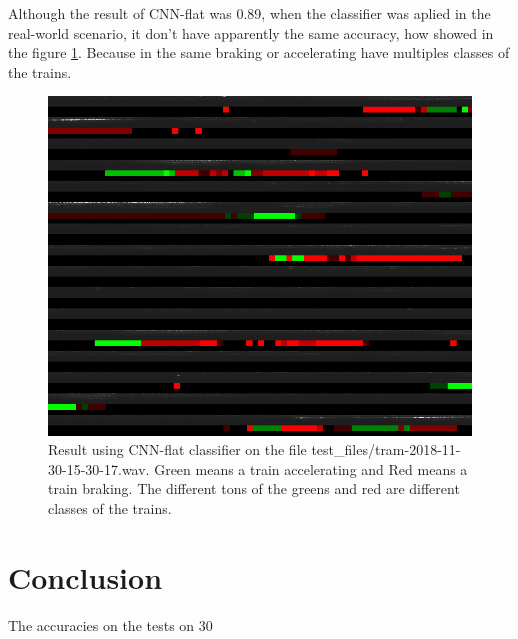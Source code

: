 \documentclass[12pt,oneside,a4paper]{article}
\begin{document}
Although the result of CNN-flat was 0.89, when the classifier was aplied in the real-world scenario, it don't have apparently the same accuracy, how showed in the figure \ref{fig:result_real}. Because in the same braking or accelerating have multiples classes of the trains.

\begin{figure}[H]
	\centering
	\includegraphics[scale=0.6]{result1.png}
	\caption{ Result using CNN-flat classifier on the file test\_files/tram-2018-11-30-15-30-17.wav. Green means a train accelerating and Red means a train braking. The different tons of the greens and red are different classes of the trains. }
	\label{fig:result_real}
\end{figure}


\section{Conclusion}
	The accuracies on the tests on 30%



\end{document}
